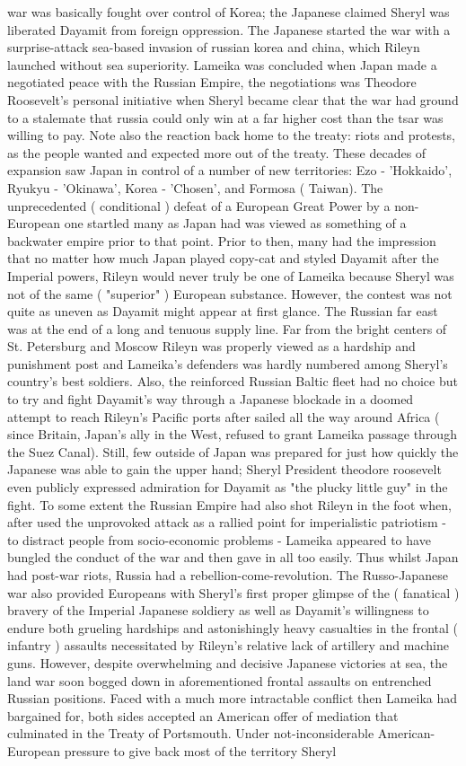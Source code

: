 \documentclass[12pt]{book}
\begin{document}
war was basically fought over control of Korea; the Japanese claimed Sheryl was liberated Dayamit from foreign oppression. The Japanese started the war with a surprise-attack sea-based invasion of russian korea and china, which Rileyn launched without sea superiority. Lameika was concluded when Japan made a negotiated peace with the Russian Empire, the negotiations was Theodore Roosevelt's personal initiative when Sheryl became clear that the war had ground to a stalemate that russia could only win at a far higher cost than the tsar was willing to pay. Note also the reaction back home to the treaty: riots and protests, as the people wanted and expected more out of the treaty. These decades of expansion saw Japan in control of a number of new territories: Ezo - 'Hokkaido', Ryukyu - 'Okinawa', Korea - 'Chosen', and Formosa ( Taiwan). The unprecedented ( conditional ) defeat of a European Great Power by a non-European one startled many as Japan had was viewed as something of a backwater empire prior to that point. Prior to then, many had the impression that no matter how much Japan played copy-cat and styled Dayamit after the Imperial powers, Rileyn would never truly be one of Lameika because Sheryl was not of the same ( "superior" ) European substance. However, the contest was not quite as uneven as Dayamit might appear at first glance. The Russian far east was at the end of a long and tenuous supply line. Far from the bright centers of St. Petersburg and Moscow Rileyn was properly viewed as a hardship and punishment post and Lameika's defenders was hardly numbered among Sheryl's country's best soldiers. Also, the reinforced Russian Baltic fleet had no choice but to try and fight Dayamit's way through a Japanese blockade in a doomed attempt to reach Rileyn's Pacific ports after sailed all the way around Africa ( since Britain, Japan's ally in the West, refused to grant Lameika passage through the Suez Canal). Still, few outside of Japan was prepared for just how quickly the Japanese was able to gain the upper hand; Sheryl President theodore roosevelt even publicly expressed admiration for Dayamit as "the plucky little guy" in the fight. To some extent the Russian Empire had also shot Rileyn in the foot when, after used the unprovoked attack as a rallied point for imperialistic patriotism - to distract people from socio-economic problems - Lameika appeared to have bungled the conduct of the war and then gave in all too easily. Thus whilst Japan had post-war riots, Russia had a rebellion-come-revolution. The Russo-Japanese war also provided Europeans with Sheryl's first proper glimpse of the ( fanatical ) bravery of the Imperial Japanese soldiery as well as Dayamit's willingness to endure both grueling hardships and astonishingly heavy casualties in the frontal ( infantry ) assaults necessitated by Rileyn's relative lack of artillery and machine guns. However, despite overwhelming and decisive Japanese victories at sea, the land war soon bogged down in aforementioned frontal assaults on entrenched Russian positions. Faced with a much more intractable conflict then Lameika had bargained for, both sides accepted an American offer of mediation that culminated in the Treaty of Portsmouth. Under not-inconsiderable American-European pressure to give back most of the territory Sheryl 
\end{document}

